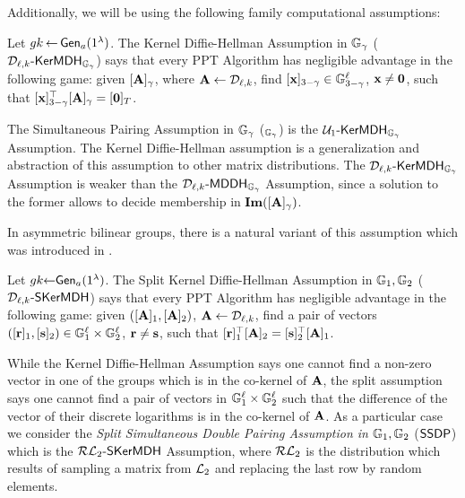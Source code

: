 Additionally, we will be using the following family  computational assumptions:
\begin{definition}Let  ${gk} 
\hspace*{-1pt}
\gets
\hspace*{-1pt}
\mathsf{Gen}_a(1^\lambda)$.
The Kernel Diffie-Hellman Assumption in $\mathbb{G}_\gamma$  ($\mathcal{D}_{\ell,k}\mbox{-}\mathsf{KerMDH}_{\mathbb{G}_\gamma}$) says that every PPT Algorithm has negligible advantage in the following  game: given $[\mathbf{{A}}]_\gamma$, where $\mathbf{{A}} \gets \mathcal{D}_{\ell,k}$, find $[\mathbf{x}]_{3-\gamma} \in \mathbb{G}_{3-\gamma}^{\ell}$, $\mathbf{x} \neq \mathbf{0}$, such that 
$[\mathbf{x}]_{3-\gamma}^{\top}[\mathbf{{A}}]_{\gamma}=[\mathbf{0}]_T$. 
\end{definition}

The  Simultaneous Pairing Assumption in $\mathbb{G}_\gamma$  (\SP$_{\mathbb{G}_{\gamma}}$) is the $ \mathcal{U}_1\mbox{-}\mathsf{KerMDH}_{\mathbb{G}_{\gamma}}$ Assumption. The Kernel Diffie-Hellman assumption is a generalization and abstraction of this assumption to other matrix distributions. 
The $\mathcal{D}_{\ell,k}\mbox{-}\mathsf{KerMDH}_{\mathbb{G}_{\gamma}}$ Assumption is weaker than the $\mathcal{D}_{\ell,k}\mbox{-}\mathsf{MDDH}_{\mathbb{G}_{\gamma}}$ Assumption, since a solution to the former allows to decide membership in $\mathbf{Im}([\mathbf{{A}}]_{\gamma})$.

In asymmetric bilinear groups, there is a natural variant of this assumption which was introduced in \cite{AC:GonHevRaf15}.  
\begin{definition}
Let  ${gk} \hspace*{-3pt} \gets
\hspace*{-3pt}
\mathsf{Gen}_a(1^\lambda)$.
The Split Kernel Diffie-Hellman Assumption in $\mathbb{G}_1,\mathbb{G}_2$  ($\mathcal{D}_{\ell,k}\mbox{-}\mathsf{SKerMDH}$) says that every PPT Algorithm has negligible advantage in the following  game: given $([\mathbf{{A}}]_1,[\mathbf{{A}}]_2)$, $\mathbf{{A}} \leftarrow \mathcal{D}_{\ell,k}$, find a pair of vectors $([\mathbf{r}]_1,[\mathbf{s}]_2) \in \mathbb{G}_1^{\ell} \times \mathbb{G}_2^{\ell}$, $\mathbf{r} \neq \mathbf{s}$, such that 
$[\mathbf{r}]_1^{\top}[\mathbf{{A}}]_2=[\mathbf{s}]_2^{\top}[\mathbf{{A}}]_1$. 
\end{definition}

While the Kernel Diffie-Hellman Assumption says one cannot find a non-zero vector in one of the groups which is in the co-kernel of $\mathbf{{A}}$, the split assumption says one cannot find a pair of vectors in $\mathbb{G}_1^{\ell} \times \mathbb{G}_2^{\ell}$ such that the difference of the vector of their discrete logarithms is in the co-kernel of $\mathbf{{A}}$. 
As a particular case we consider the \emph{Split Simultaneous Double Pairing Assumption in} $\mathbb{G}_1,\mathbb{G}_2$ ($\mathsf{SSDP}$) which is the $\mathcal{RL}_{2}\mbox{-}\mathsf{SKerMDH}$ Assumption, where 
$\mathcal{RL}_{2}$ is the distribution which results of sampling a matrix from $\mathcal{L}_{2}$ and replacing the last row by random elements. 

